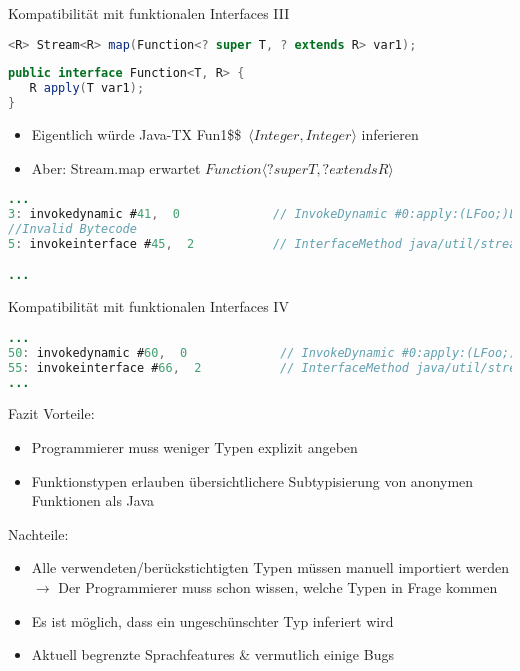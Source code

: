 \documentclass{beamer}
\begin{document}
\begin{frame}[fragile]{Kompatibilität mit funktionalen Interfaces III}

   \begin{lstlisting}[language=java]
<R> Stream<R> map(Function<? super T, ? extends R> var1);
   \end{lstlisting}
   \begin{lstlisting}[language=java]
public interface Function<T, R> {
   R apply(T var1);
}
   \end{lstlisting}
\vspace*{\baselineskip}
\begin{itemize}
    \item Eigentlich würde Java-TX Fun1\$\$\ $\langle{}Integer, Integer\rangle{}$ inferieren
    \item Aber: Stream.map erwartet $Function\langle{}? super T, ? extends R\rangle{}$
\end{itemize}
\begin{lstlisting}[language=java]
...
3: invokedynamic #41,  0             // InvokeDynamic #0:apply:(LFoo;)LFun1$$Ljava$lang$Integer$_$Ljava$lang$Integer$_$;
//Invalid Bytecode
5: invokeinterface #45,  2           // InterfaceMethod java/util/stream/Stream.map:(Ljava/util/function/Function;)Ljava/util/stream/Stream;

...
\end{lstlisting}
\end{frame}

\begin{frame}[fragile]{Kompatibilität mit funktionalen Interfaces IV}
\begin{lstlisting}[language=java]
...
50: invokedynamic #60,  0             // InvokeDynamic #0:apply:(LFoo;)Ljava/util/function/Function;
55: invokeinterface #66,  2           // InterfaceMethod java/util/stream/Stream.map:(Ljava/util/function/Function;)Ljava/util/stream/Stream;
...
\end{lstlisting}
\end{frame}


\begin{frame}{Fazit}
    Vorteile:
    \begin{itemize}
        \item Programmierer muss weniger Typen explizit angeben
        \item Funktionstypen erlauben übersichtlichere Subtypisierung von anonymen Funktionen als Java
    \end{itemize}

    Nachteile:
    \begin{itemize}
        \item Alle verwendeten/berückstichtigten Typen müssen manuell importiert werden \\
        \(\rightarrow\) Der Programmierer muss schon wissen, welche Typen in Frage kommen
        \item Es ist möglich, dass ein ungeschünschter Typ inferiert wird
        \item Aktuell begrenzte Sprachfeatures \& vermutlich einige Bugs
    \end{itemize}
    
\end{frame}
\end{document}
